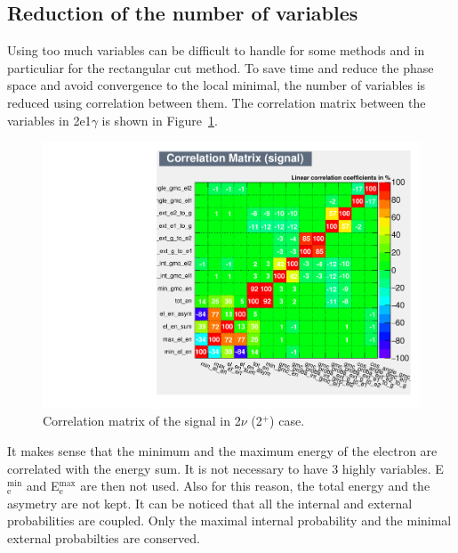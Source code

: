 \documentclass[main.tex]{subfiles}
\begin{document}
\FloatBarrier

\subsection{Reduction of the number of variables}\label{sec:ReductionNumberVariables}


\NI Using too much variables can be difficult to handle for some methods and in particuliar for the rectangular cut method. To save time and reduce the phase space and avoid convergence to the local minimal, the number of variables is reduced using correlation between them. The correlation matrix between the variables in 2e1$\gamma$ is shown in Figure~\ref{CorrelationMatrix}.


\begin{figure} [h!]
\begin{center}
\includegraphics[scale=0.50]{pictures/FinalResults/bb2nu2/150/preselection/CorrelationMatrixBB0nu_2_signal.pdf}
\end{center}
\caption{Correlation matrix of the signal in 2$\nu$ (2$^+$) case.}
\label{CorrelationMatrix}
\end{figure}


\NI It makes sense that the minimum and the maximum energy of the electron are correlated with the energy sum. It is not necessary to have 3 highly variables. E$_\text{e}^{\text{min}}$ and E$_\text{e}^{\text{max}}$ are then not used. Also for this reason, the total energy and the asymetry are not kept. It can be noticed that all the internal and external probabilities are coupled. Only the maximal internal probability and the minimal external probabilties are conserved.
\end{document}
